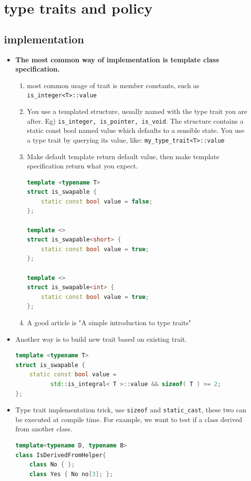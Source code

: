 \documentclass[a4paper,11pt,twoside]{book}
\begin{document}
\section{type traits and policy}
\subsection{implementation}
\begin{itemize}
	\item \textbf{The most common way of implementation is template class specification.}
	\begin{enumerate}
		\item most common usage of trait is member constants, such as \texttt{is\_integer<T>::value}
		
		\item You use a templated structure, usually named with the type trait you are after. Eg) \texttt{is\_integer, is\_pointer, is\_void}. The structure contains a static const bool named value which defaults to a sensible state. You use a type trait by querying its value, like: \texttt{my\_type\_trait<T>::value}
		
		\item Make default template return default value, then make template specification return what you expect. 
\begin{lstlisting}[frame=single, language=c++]
template <typename T>
struct is_swapable {
	static const bool value = false;
};
		
template <>
struct is_swapable<short> {
	static const bool value = true;
};
		
template <>
struct is_swapable<int> {
	static const bool value = true;
};
\end{lstlisting}
		\item A good article is "A simple introduction to type traits"
	\end{enumerate}
	
	\item Another way is to build new trait based on existing trait.
	\begin{lstlisting}[frame=single, language=c++]
template <typename T>
struct is_swapable {
	static const bool value = 
	      std::is_integral< T >::value && sizeof( T ) >= 2;
};
	\end{lstlisting}
	
\item Type trait implementation trick, use \texttt{sizeof} and \texttt{static\_cast}, these two can be executed at compile time. For example, we want to test if a class derived from another class.
\begin{lstlisting}[frame=single, language=c++]
template<typename D, typename B>
class IsDerivedFromHelper{
	class No { };
	class Yes { No no[3]; };
	

\end{lstlisting}
\end{itemize}
\end{document}
